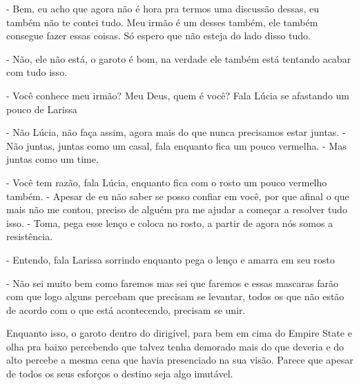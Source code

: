 - Bem, eu acho que agora não é hora pra termos uma discussão dessas, eu também não te contei tudo. Meu irmão é um desses também, ele também consegue fazer essas coisas. Só espero que não esteja do lado disso tudo.

- Não, ele não está, o garoto é bom, na verdade ele também está tentando acabar com tudo isso.

- Você conhece meu irmão? Meu Deus, quem é você? Fala Lúcia se afastando um pouco de Larissa

- Não Lúcia, não faça assim, agora mais do que nunca precisamos estar juntas. - Não juntas, juntas como um casal, fala enquanto fica um pouco vermelha. - Mas juntas como um time.

- Você tem razão, fala Lúcia, enquanto fica com o rosto um pouco vermelho também. - Apesar de eu não saber se posso confiar em você, por que afinal o que mais não me contou, preciso de alguém pra me ajudar a começar a resolver tudo isso. - Toma, pega esse lenço e coloca no rosto, a partir de agora nós somos a resistência.

- Entendo, fala Larissa sorrindo enquanto pega o lenço e amarra em seu rosto

- Não sei muito bem como faremos mas sei que faremos e essas mascaras farão com que logo alguns percebam que precisam se levantar, todos os que não estão de acordo com o que está acontecendo, precisam se unir.

Enquanto isso, o garoto dentro do dirigível, para bem em cima do Empire State e olha pra baixo percebendo que talvez tenha demorado mais do que deveria e do alto percebe a mesma cena que havia presenciado na sua visão. Parece que apesar de todos os seus esforços o destino seja algo imutável.

